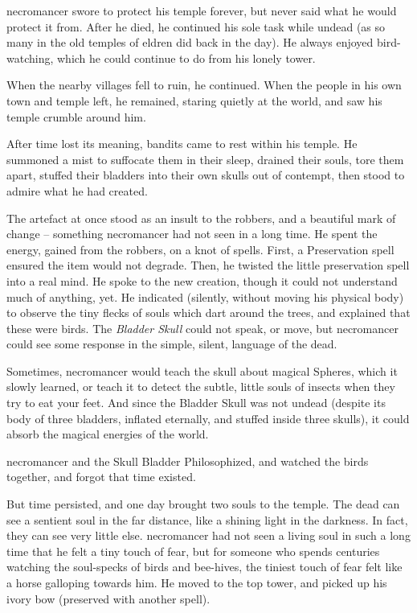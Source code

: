
\label{necroStory}
\begin{exampletext}
  \noindent
  \Gls{necromancer} swore to protect his temple forever, but never said what he would protect it from.
  After he died, he continued his sole task while undead (as so many in the old temples of \gls{eldren} did back in the day).
  He always enjoyed bird-watching, which he could continue to do from his lonely tower.

  When the nearby \glspl{village} fell to ruin, he continued.
  When the people in his own town and temple left, he remained, staring quietly at the world, and saw his temple crumble around him.

  After time lost its meaning, bandits came to rest within his temple.
  He summoned a mist to suffocate them in their sleep, drained their souls, tore them apart, stuffed their bladders into their own skulls out of contempt, then stood to admire what he had created.

  The \gls{artefact} at once stood as an insult to the robbers, and a beautiful mark of change -- something \gls{necromancer} had not seen in a long time.
  He spent the energy, gained from the robbers, on a knot of spells.
  First, a Preservation spell ensured the item would not degrade.
  Then, he twisted the little preservation spell into a real mind.
  He spoke to the new creation, though it could not understand much of anything, yet.
  He indicated (silently, without moving his physical body) to observe the tiny flecks of souls which dart around the trees, and explained that these were birds.
  The \textit{Bladder Skull} could not speak, or move, but \gls{necromancer} could see some response in the simple, silent, language of the dead.

  Sometimes, \gls{necromancer} would teach the skull about magical Spheres, which it slowly learned, or teach it to detect the subtle, little souls of insects when they try to eat your feet.
  And since the Bladder Skull was not undead (despite its body of three bladders, inflated eternally, and stuffed inside three skulls), it could absorb the magical energies of the world.

  \Gls{necromancer} and the Skull Bladder Philosophized, and watched the birds together, and forgot that time existed.

  But time persisted, and one day brought two souls to the temple.
  The dead can see a sentient soul in the far distance, like a shining light in the darkness.
  In fact, they can see very little else.
  \Gls{necromancer} had not seen a living soul in such a long time that he felt a tiny touch of fear, but for someone who spends centuries watching the soul-specks of birds and bee-hives, the tiniest touch of fear felt like a horse galloping towards him.
  He moved to the top tower, and picked up his ivory bow (preserved with another spell).


\end{exampletext}
